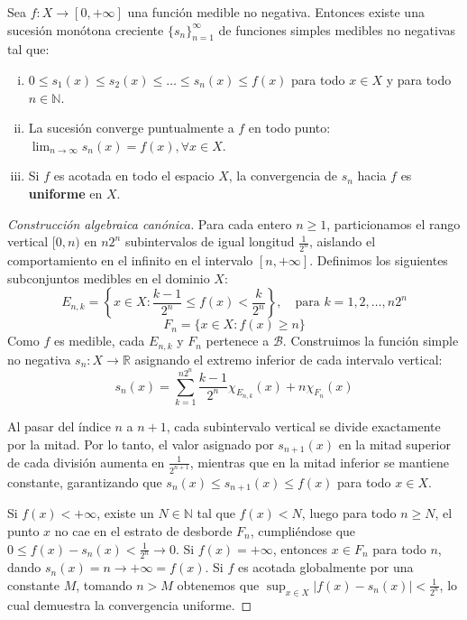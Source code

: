 \begin{teorema}
	Sea $f: X \to [0, +\infty]$ una función medible no negativa. Entonces existe una sucesión monótona creciente $\{s_n\}_{n=1}^\infty$ de funciones simples medibles no negativas tal que:
	\begin{enumerate}[i)]
		\item $0 \le s_1(x) \le s_2(x) \le \dots \le s_n(x) \le f(x)$ para todo $x \in X$ y para todo $n \in \mathbb{N}$.
		\item La sucesión converge puntualmente a $f$ en todo punto: $\lim_{n \to \infty} s_n(x) = f(x), \forall x \in X$.
		\item Si $f$ es acotada en todo el espacio $X$, la convergencia de $s_n$ hacia $f$ es \textbf{uniforme} en $X$.
	\end{enumerate}
\end{teorema}

\begin{proof}[Construcción algebraica canónica]
	Para cada entero $n \ge 1$, particionamos el rango vertical $[0, n)$ en $n2^n$ subintervalos de igual longitud $\frac{1}{2^n}$, aislando el comportamiento en el infinito en el intervalo $[n, +\infty]$. Definimos los siguientes subconjuntos medibles en el dominio $X$:
	$$ E_{n, k} = \left\{ x \in X : \frac{k-1}{2^n} \le f(x) < \frac{k}{2^n} \right\}, \quad \text{para } k = 1, 2, \dots, n2^n $$
	$$ F_n = \{ x \in X : f(x) \ge n \} $$
	Como $f$ es medible, cada $E_{n,k}$ y $F_n$ pertenece a $\mathcal{B}$. Construimos la función simple no negativa $s_n: X \to \mathbb{R}$ asignando el extremo inferior de cada intervalo vertical:
	$$ s_n(x) = \sum_{k=1}^{n2^n} \frac{k-1}{2^n} \chi_{E_{n, k}}(x) + n \chi_{F_n}(x) $$
	
	Al pasar del índice $n$ a $n+1$, cada subintervalo vertical se divide exactamente por la mitad. Por lo tanto, el valor asignado por $s_{n+1}(x)$ en la mitad superior de cada división aumenta en $\frac{1}{2^{n+1}}$, mientras que en la mitad inferior se mantiene constante, garantizando que $s_n(x) \le s_{n+1}(x) \le f(x)$ para todo $x \in X$.
	
	Si $f(x) < +\infty$, existe un $N \in \mathbb{N}$ tal que $f(x) < N$, luego para todo $n \ge N$, el punto $x$ no cae en el estrato de desborde $F_n$, cumpliéndose que $0 \le f(x) - s_n(x) < \frac{1}{2^n} \to 0$. Si $f(x) = +\infty$, entonces $x \in F_n$ para todo $n$, dando $s_n(x) = n \to +\infty = f(x)$. Si $f$ es acotada globalmente por una constante $M$, tomando $n > M$ obtenemos que $\sup_{x \in X} |f(x) - s_n(x)| < \frac{1}{2^n}$, lo cual demuestra la convergencia uniforme.
\end{proof}

